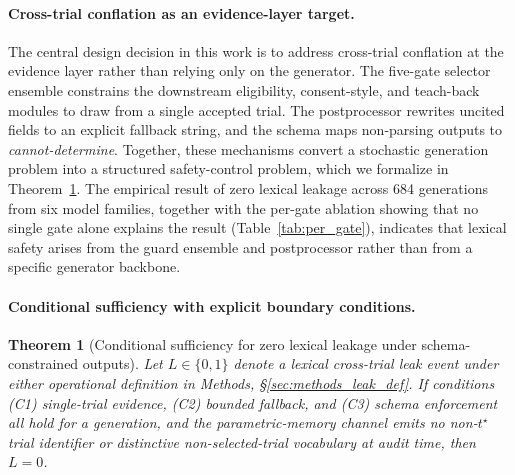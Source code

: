 \documentclass[pdflatex,Numbered]{sn-jnl}
\theoremstyle{plain}
\newtheorem{theorem}{Theorem}
\begin{document}
\paragraph{Cross-trial conflation as an evidence-layer target.}
The central design decision in this work is to address cross-trial conflation at the evidence layer rather than relying only on the generator. The five-gate selector ensemble constrains the downstream eligibility, consent-style, and teach-back modules to draw from a single accepted trial. The postprocessor rewrites uncited fields to an explicit fallback string, and the schema maps non-parsing outputs to \emph{cannot-determine}. Together, these mechanisms convert a stochastic generation problem into a structured safety-control problem, which we formalize in Theorem~\ref{thm:safety}. The empirical result of zero lexical leakage across 684 generations from six model families, together with the per-gate ablation showing that no single gate alone explains the result (Table~\ref{tab:per_gate}), indicates that lexical safety arises from the guard ensemble and postprocessor rather than from a specific generator backbone.

\paragraph{Conditional sufficiency with explicit boundary conditions.}
\begin{theorem}[Conditional sufficiency for zero lexical leakage under schema-constrained outputs]
\label{thm:safety}
Let $L \in \{0, 1\}$ denote a lexical cross-trial leak event under either operational definition in Methods, \S\ref{sec:methods_leak_def}. If conditions {\rm(C1) single-trial evidence}, {\rm(C2) bounded fallback}, and {\rm(C3) schema enforcement} all hold for a generation, and the parametric-memory channel emits no non-$t^\star$ trial identifier or distinctive non-selected-trial vocabulary at audit time, then $L = 0$.
\end{theorem}
\end{document}
